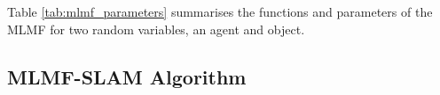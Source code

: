 Table \ref{tab:mlmf_parameters} summarises the functions and parameters of the MLMF for two random variables, an agent and object.
\begin{table}[h]
\centering
{}
\caption{MLMF functions with associated parameters. The marginal parameters are the discretisation of the 
state space $\boldsymbol{\theta} \in \mathbb{R}^N$, $\boldsymbol{\theta}^{(s)}$ corresponds to the probability being in state $s$.}
\label{tab:mlmf_parameters}
\end{table}

\subsection{MLMF-SLAM Algorithm}

